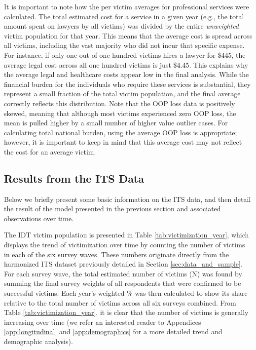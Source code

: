 It is important to note how the per victim averages for professional services were calculated. The total estimated cost for a service in a given year (e.g., the total amount spent on lawyers by all victims) was divided by the entire {\em unweighted} victim population for that year. This means that the average cost is spread across all victims, including the vast majority who did not incur that specific expense. For instance, if only one out of one hundred victims hires a lawyer for \$445, the average legal cost across all one hundred victims is just \$4.45. This explains why the average legal and healthcare costs appear low in the final analysis. While the financial burden for the individuals who require these services is substantial, they represent a small fraction of the total victim population, and the final average correctly reflects this distribution. Note that the OOP loss data is positively skewed, meaning that although most victims experienced zero OOP loss, the mean is pulled higher by a small number of higher value outlier cases. For calculating total national burden, using the average OOP loss is appropriate; however, it is important to keep in mind that this average cost may not reflect the cost for an average victim.





\subsection{Results from the ITS Data}
Below we briefly present some basic information on the ITS data, and then detail the result of the model presented in the previous section and associated observations over time.


The IDT victim population is presented in Table \ref{tab:victimization_year}, which displays the trend of victimization over time by counting the number of victims in each of the six survey waves. These numbers originate directly from the harmonized ITS dataset previously detailed in Section \ref{sec:data_and_sample}. For each survey wave, the total estimated number of victims (N) was found by summing the final survey weights of all respondents that were confirmed to be successful victims. Each year's weighted \% was then calculated to show its share relative to the total number of victims across all six surveys combined. From Table \ref{tab:victimization_year}, it is clear that the number of victims is generally increasing over time (we refer an interested reader to  Appendices \ref{app:longitudinal} and \ref{app:demographics} for a more detailed trend and demographic analysis).


